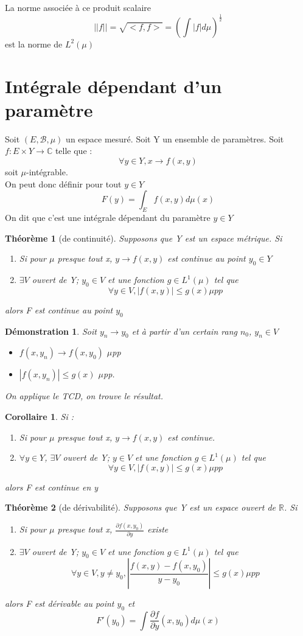 \documentclass{article}
\theoremstyle{mes_theoremes}
\newtheorem{coro}{Corollaire}[section]
\newtheorem{theo}{Théorème}[section]
\newtheorem*{dem}{Démonstration}
\begin{document}
La norme associée à ce produit scalaire \[||f||=\sqrt{<f,f>}=\left(\int|f|d\mu\right)^{\frac{1}{2}}\] est la norme de $L^2(\mu)$

\newpage
\part{Intégrale dépendant d'un paramètre}
Soit $(E,\mathcal{B},\mu)$ un espace mesuré. Soit Y un ensemble de paramètres. Soit $f:E\times Y \rightarrow \mathbb{C}$ telle que : \[\forall y\in Y, x\rightarrow f(x,y)\] soit $\mu$-intégrable. \\
On peut donc définir pour tout $y\in Y$ \[F(y)=\int_E f(x,y)d\mu(x)\]
On dit que c'est une intégrale dépendant du paramètre $y\in Y$

\begin{theo}[de continuité]
Supposons que Y est un espace métrique. Si 
\begin{enumerate}
\item Si pour $\mu$ presque tout x, $y\rightarrow f(x,y)$ est continue au point $y_0\in Y$
\item $\exists V$ ouvert de Y; $y_0\in V$ et une fonction $g\in L^1(\mu)$ tel que \[\forall y\in V, |f(x,y)|\leq g(x) \mu pp\]
\end{enumerate}
alors F est continue au point $y_0$
\end{theo}

\begin{dem}
Soit $y_n\rightarrow y_0$ et à partir d'un certain rang $n_0$, $y_n\in V$
\begin{itemize}
\item $f(x,y_n) \rightarrow f(x,y_0)$ $\mu$pp
\item $|f(x,y_n)| \leq g(x)$ $\mu$pp.
\end{itemize}
On applique le TCD, on trouve le résultat.
\end{dem}

\begin{coro}
Si :
\begin{enumerate}
\item Si pour $\mu$ presque tout x, $y\rightarrow f(x,y)$ est continue.
\item $\forall y\in Y$, $\exists V$ ouvert de Y; $y\in V$ et une fonction $g\in L^1(\mu)$ tel que \[\forall y\in V, |f(x,y)|\leq g(x) \mu pp\]
\end{enumerate}
alors F est continue en y
\end{coro}

\begin{theo}[de dérivabilité]
Supposons que Y est un espace ouvert de $\mathbb{R}$. Si 
\begin{enumerate}
\item Si pour $\mu$ presque tout x, $\frac{\partial f(x,y_0)}{\partial y}$ existe
\item $\exists V$ ouvert de Y; $y_0\in V$ et une fonction $g\in L^1(\mu)$ tel que \[\forall y\in V, y\neq y_0, \left|\frac{f(x,y)-f(x,y_0)}{y-y_0}\right|\leq g(x) \mu pp\]
\end{enumerate}
alors F est dérivable au point $y_0$ et \[F'(y_0)=\int \frac{\partial f}{\partial y} (x,y_0) d\mu(x)\]
\end{theo}
\end{document}
